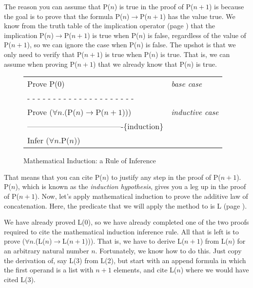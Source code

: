 The reason you can assume that P($n$) is true in the proof of P($n+1$)
is because the goal is to prove that the formula
P($n$)$\rightarrow$P($n+1$) has the value true.
We know from the truth table of the implication operator
(page \pageref{implication-truth-table}) that the implication
P($n$)$\rightarrow$P($n+1$) is true when P($n$) is false,
regardless of the value of P($n+1$), so we can ignore the case when P($n$) is false.
The upshot is that we only need to verify that P($n+1$) is true when P($n$) is true.
That is, we can assume when proving P($n+1$) that we already know that P($n$) is true.
\begin{figure}
\begin{center}
\begin{tabular}{ll}
Prove P(0)                                         &\emph{base case}\\
 - - - - - - - - - - - - - - - - - - - - -         &\\
Prove ($\forall$$n$.(P($n$)$\rightarrow$P($n+1$))) &\emph{inductive case}\\
-------------------------------------\{induction\} &\\
Infer ($\forall$$n$.P($n$))                        &\\
\end{tabular}
\end{center}
\caption{Mathematical Induction: a Rule of Inference}
\label{fig-04-01}
\label{induction-rule}
\end{figure}

That means that you can cite P($n$) to justify any step in the proof of P($n+1$).
P($n$), which is known as the \emph{induction hypothesis}, gives you a leg up in the proof of P($n+1$).
\label{induction-hyp-def}
Now, let's apply mathematical induction to prove
the additive law of concatenation.
Here, the predicate that we will apply the method to is L (page \pageref{additive-concat-law-predicate}).

\label{len-additive-thm}
We have already proved L(0), so we have already completed one of the
two proofs required to cite the mathematical induction inference rule.
All that is left is to prove ($\forall$$n$.(L($n$)$\rightarrow$L($n+1$))).
That is, we have to derive L($n+1$) from L($n$) for an arbitrary natural number $n$.
Fortunately, we know how to do this. Just copy the derivation of,
say L(3) from L(2), but start with an append formula in which the first operand
is a list with $n+1$ elements, and cite L($n$) where we would have cited L(3).

